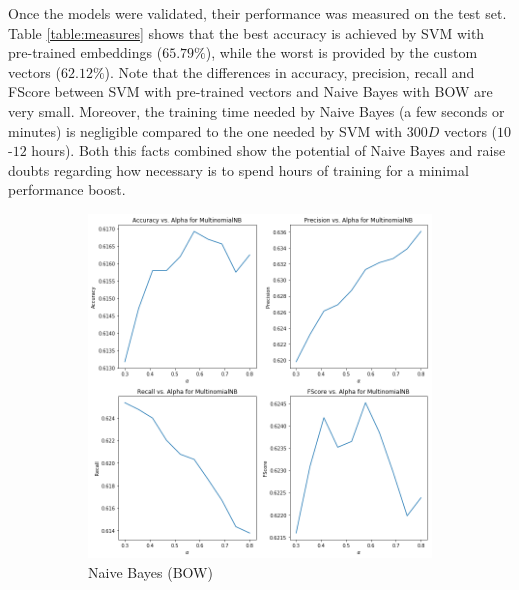 \documentclass[11pt,a4paper]{article}
\begin{document}
Once the models were validated, their performance was measured on the test set.\\
Table \ref{table:measures} shows that the best accuracy is achieved by SVM with
pre-trained embeddings ($65.79\%$), while the worst is provided by the custom vectors
($62.12\%$).
Note that the differences in accuracy, precision, recall and FScore between SVM with
pre-trained vectors and Naive Bayes with BOW are very small. Moreover, the training
time needed by Naive Bayes (a few seconds or minutes) is negligible compared to
the one needed by SVM with $300D$ vectors ($10$-$12$ hours). Both this facts
combined show the potential of Naive Bayes and raise doubts regarding how necessary
is to spend hours of training for a minimal performance boost.


\begin{figure}[h!] %
\centering
	\begin{subfigure}[h!]{0.3\textwidth}
		\includegraphics[width=\linewidth]{plots_nb.png}
		\caption{Naive Bayes (BOW)}
		\label{fig:nb_val}
	\end{subfigure}
	~
	\begin{subfigure}[h!]{0.3\textwidth}

\end{subfigure}
\end{figure}
\end{document}
